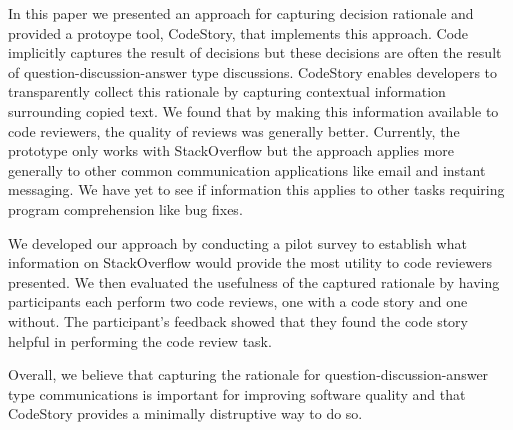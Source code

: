 \documentclass[../manifest.tex]{subfiles}
\begin{document}
In this paper we presented an approach for capturing decision rationale and provided a protoype tool, CodeStory, that implements this approach. Code implicitly captures the result of decisions but these decisions are often the result of question-discussion-answer type discussions. CodeStory enables developers to transparently collect this rationale by capturing contextual information surrounding copied text. We found that by making this information available to code reviewers, the quality of reviews was generally better. Currently, the prototype only works with StackOverflow but the approach applies more generally to other common communication applications like email and instant messaging. We have yet to see if information this applies to other tasks requiring program comprehension like bug fixes.

We developed our approach by conducting a pilot survey to establish what information on StackOverflow would provide the most utility to code reviewers presented. We then evaluated the usefulness of the captured rationale by having participants each perform two code reviews, one with a code story and one without. The participant's feedback showed that they found the code story helpful in performing the code review task.

Overall, we believe that capturing the rationale for question-discussion-answer type communications is important for improving software quality and that CodeStory provides a minimally distruptive way to do so.
\end{document}
